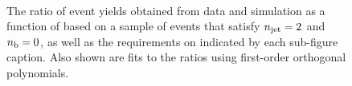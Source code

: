 \begin{figure}[h!]
\begin{center}
    \\
    \caption{The ratio of event yields obtained from data and simulation as a function of \mht [GeV] based on a sample of \mmj events that satisfy $n_{\text{jet}} = 2$ and $n_{\text{b}} = 0$, as well as the requirements on \scalht indicated by each sub-figure caption. Also shown are fits to the ratios using first-order orthogonal polynomials.}
    \label{fig:mhtval_MuMu_eq2j_eq0b}
  \end{center}
\end{figure}


